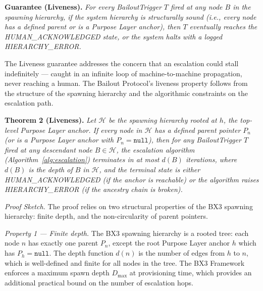 \bigskip

\begin{minipage}{\tmpdimb}
\textbf{Guarantee (Liveness).} \textit{For every BailoutTrigger $T$ fired at any node $B$ in the spawning hierarchy, if the system hierarchy is structurally sound (i.e., every node has a defined parent or is a Purpose Layer anchor), then $T$ eventually reaches the HUMAN\_ACKNOWLEDGED state, or the system halts with a logged HIERARCHY\_ERROR.}
\end{minipage}

\bigskip

The Liveness guarantee addresses the concern that an escalation could stall indefinitely — caught in an infinite loop of machine-to-machine propagation, never reaching a human. The Bailout Protocol's liveness property follows from the structure of the spawning hierarchy and the algorithmic constraints on the escalation path.

\bigskip

\noindent\textbf{Theorem 2 (Liveness).}
\textit{Let $\mathcal{H}$ be the spawning hierarchy rooted at $h$, the top-level Purpose Layer anchor. If every node in $\mathcal{H}$ has a defined parent pointer $P_n$ (or is a Purpose Layer anchor with $P_n = \texttt{null}$), then for any BailoutTrigger $T$ fired at any descendant node $B \in \mathcal{H}$, the escalation algorithm (Algorithm~\ref{alg:escalation}) terminates in at most $d(B)$ iterations, where $d(B)$ is the depth of $B$ in $\mathcal{H}$, and the terminal state is either HUMAN\_ACKNOWLEDGED (if the anchor is reachable) or the algorithm raises HIERARCHY\_ERROR (if the ancestry chain is broken).}

\bigskip

\noindent\textit{Proof Sketch.} The proof relies on two structural properties of the BX3 spawning hierarchy: finite depth, and the non-circularity of parent pointers.

\medskip

\noindent\textit{Property 1 — Finite depth.} The BX3 spawning hierarchy is a rooted tree: each node $n$ has exactly one parent $P_n$, except the root Purpose Layer anchor $h$ which has $P_h = \texttt{null}$. The depth function $d(n)$ is the number of edges from $h$ to $n$, which is well-defined and finite for all nodes in the tree. The BX3 Framework enforces a maximum spawn depth $D_{\max}$ at provisioning time, which provides an additional practical bound on the number of escalation hops.

\medskip

